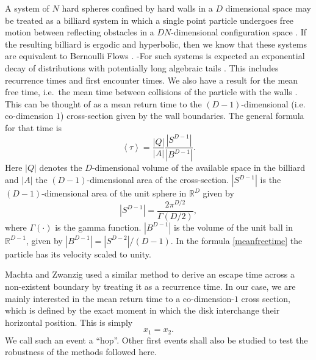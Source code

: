 \documentclass[letterpaper,10pt, jcp, aps]{revtex4-1}
\newcommand{\mean}[1]{\left \langle #1 \right \rangle}
\newcommand{\RR}{\mathbb{R}}
\begin{document}
A system of $N$ hard spheres confined by hard walls in a $D$ dimensional
space may be treated as a billiard system 
in which a single point  particle undergoes free motion between reflecting obstacles 
in a $ D N $-dimensional configuration space \cite{Sinai70, Sim99, MarkChern}. 
If the resulting billiard is ergodic and hyperbolic, then we know that
these systems are equivalent to Bernoulli Flows \cite{Gallavotti74}.
-For such systems is expected an exponential decay of 
distributions \cite{AbadiGalves} with potentially
long algebraic tails \cite{ZasTip}. 
This includes recurrence times and
first encounter times. We also
have a result for the mean free time, i.e.\ the mean time between 
collisions of the particle with the walls \cite{MarkChern}. 
This can be thought of as a mean return time to the $(D-1)$-dimensional 
(i.e. co-dimension $1$) cross-section given by the wall boundaries.
The general formula for that time is
\begin{equation}\label{meanfreetime}
 \mean{\tau} = \frac{|Q|}{|A|} \frac{|S^{D-1}|}{|B^{D-1}|}.
\end{equation}
Here $|Q|$ denotes the $D$-dimensional volume of the available 
space in the billiard and 
$|A|$ the $(D-1)$-dimensional area of the cross-section.
 $|S^{D-1}|$ is the $(D-1)$-dimensional area of the unit sphere in $\RR^D$ given by
\begin{equation}
  |S^{D-1}| = \frac{2 \pi^{D/2}}{\Gamma(D/2)},
\end{equation}
where $\Gamma(\cdot)$ is the gamma function. 
$|B^{D-1}|$ is the volume of the unit ball 
in $\RR^{D-1}$, given by $|B^{D-1}| = |S^{D-2}| / (D-1)$.
In the formula \ref{meanfreetime}  the particle has 
its velocity scaled to unity.

Machta and Zwanzig \cite{MachtaZwan} used a similar method to derive an escape 
time across a non-existent boundary by treating it as a recurrence time.
In our case, we are mainly interested in the mean return time to 
a co-dimension-$1$ cross section, 
which is defined by the exact moment
in which the disk interchange their horizontal position. This is simply
\begin{equation} \label{condchoque}
x_1 = x_2.
\end{equation}
We call such an event a ``hop''. Other first events shall also be studied
to test the robustness of the methods followed here.
\end{document}
